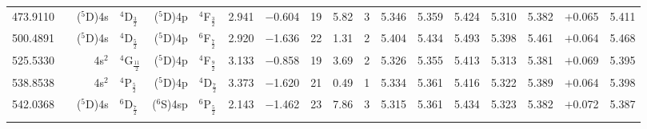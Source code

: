 \documentclass[traditabstract]{aa}
\newcommand{\pst}{\phantom{*}}
\begin{document}
\begin{center}
\begin{mpsupertabular}{r@{}c@{\ \ \ }r@{~}l@{\ }r@{~}l@{\ \ \ }c@{\ \ \ }c@{\ \ \ }c@{\ \ \ }c@{\ \ \ }c@{\ \ \ }c@{\ \ \ }c@{\ \ \ }c@{\ \ \ }c@{\ \ \ }c@{\ \ \ }r@{\ \ \ }c}
473.9110 & & \footnotesize ($^5$D)4s &\footnotesize$^4$D$_\frac{3}{2}$   &\footnotesize($^5$D)4p  &\footnotesize$^4$F$_\frac{3}{2}$   & 2.941 & $-$0.604 &19  & 5.82 & 3\pst      & 5.346 & 5.359 & 5.424 & 5.310 & 5.382 & $+$0.065    & 5.411 \\
500.4891 & & \footnotesize ($^5$D)4s &\footnotesize$^4$D$_\frac{5}{2}$   &\footnotesize($^5$D)4p  &\footnotesize$^6$F$_\frac{7}{2}$   & 2.920 & $-$1.636 &22  & 1.31 & 2\pst      & 5.404 & 5.434 & 5.493 & 5.398 & 5.461 & $+$0.064    & 5.468 \\
525.5330 & & \footnotesize 4s$^2$    &\footnotesize$^4$G$_\frac{11}{2}$  &\footnotesize($^5$D)4p  &\footnotesize$^4$F$_\frac{9}{2}$   & 3.133 & $-$0.858 &19  & 3.69 & 2\pst      & 5.326 & 5.355 & 5.413 & 5.313 & 5.381 & $+$0.069    & 5.395 \\
538.8538 & & \footnotesize 4s$^2$    &\footnotesize$^4$P$_\frac{5}{2}$   &\footnotesize($^5$D)4p  &\footnotesize$^4$D$_\frac{7}{2}$   & 3.373 & $-$1.620 &21  & 0.49 & 1\pst      & 5.334 & 5.361 & 5.416 & 5.322 & 5.389 & $+$0.064    & 5.398 \\
542.0368 & & \footnotesize ($^5$D)4s &\footnotesize$^6$D$_\frac{7}{2}$   &\footnotesize($^6$S)4sp &\footnotesize$^6$P$_\frac{5}{2}$   & 2.143 & $-$1.462 &23  & 7.86 & 3\pst      & 5.315 & 5.361 & 5.434 & 5.323 & 5.382 & $+$0.072    & 5.387 \\
   & & & & & & & & & & & & & & & \\


\end{mpsupertabular}
\end{center}
\end{document}
